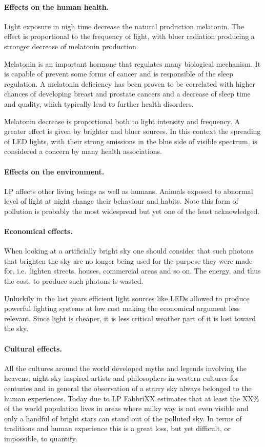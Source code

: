 \documentclass[a4paper, titlepage, 10pt]{book}
\begin{document}
\paragraph{Effects on the human health.} Light exposure in nigh time decrease the natural production melatonin. The effect is proportional to the frequency of light, with bluer radiation producing a stronger decrease of melatonin production.
	
Melatonin is an important hormone that regulates many biological mechanism. It is capable of prevent some forms of cancer and is responsible of the sleep regulation. A melatonin deficiency has been proven to be correlated with higher chances of developing breast and prostate cancers and a decrease of sleep time and quality, which typically lead to further health disorders.
	
Melatonin decrease is proportional both to light intensity and frequency. A greater effect is given by brighter and bluer sources. In this context the spreading of LED lights, with their strong emissions in the blue side of visible spectrum, is considered a concern by many health associations.

\paragraph{Effects on the environment.} LP affects other living beings as well as humans. Animals exposed to abnormal level of light at night change their behaviour and habits. Note this form of pollution is probably the most widespread but yet one of the least acknowledged.

\paragraph{Economical effects.} When looking at a artificially bright sky one should consider that such photons that brighten the sky are no longer being used for the purpose they were made for, i.e.\ lighten streets, houses, commercial areas and so on. The energy, and thus the cost, to produce such photons is wasted. 

Unluckily in the last years efficient light sources like LEDs allowed to produce powerful lighting systems at low cost making the economical argument less relevant. Since light is cheaper, it is less critical weather part of it is lost toward the sky.

\paragraph{Cultural effects.} All the cultures around the world developed myths and legends involving the heavens; night sky inspired artists and philosophers in western cultures for centuries and in general the observation of a starry sky always belonged to the human experiences. Today due to LP FabbriXX estimates that at least the XX\% of the world population lives in areas where milky way is not even visible and only a handful of bright stars can stand out of the polluted sky. In terms of traditions and human experience this is a great loss, but yet difficult, or impossible, to quantify.
\end{document}
